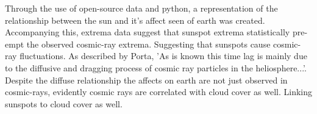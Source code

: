 Through the use of open-source data and python, a representation of the
relationship between the sun and it's affect seen of earth was created.
Accompanying this, extrema data suggest that sunspot extrema statistically
pre-empt the observed cosmic-ray extrema. Suggesting that sunspots cause
cosmic-ray fluctuations. As described by Porta, 'As is known this time lag
is mainly due to the diffusive and dragging process of cosmic ray particles
in the heliosphere...'\cite{Sierra-Porta2019}. Despite the diffuse
relationship the affects on earth are not just observed in cosmic-rays,
evidently cosmic rays are correlated with cloud cover as well.\cite{Svensmark2016}
Linking sunspots to cloud cover as well.	
